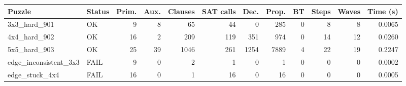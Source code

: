 \begin{tabular}{l l r r r r r r r r r r }
\hline
Puzzle & Status & Prim. & Aux. & Clauses & SAT calls & Dec. & Prop. & BT & Steps & Waves & Time (s) \\
\hline
3x3\_hard\_901 & OK & 9 & 8 & 65 & 44 & 0 & 285 & 0 & 8 & 8 & 0.0065 \\
4x4\_hard\_902 & OK & 16 & 2 & 209 & 119 & 351 & 974 & 0 & 14 & 12 & 0.0260 \\
5x5\_hard\_903 & OK & 25 & 39 & 1046 & 261 & 1254 & 7889 & 4 & 22 & 19 & 0.2247 \\
edge\_inconsistent\_3x3 & FAIL & 9 & 0 & 2 & 1 & 0 & 1 & 0 & 0 & 0 & 0.0002 \\
edge\_stuck\_4x4 & FAIL & 16 & 0 & 1 & 16 & 0 & 16 & 0 & 0 & 0 & 0.0005 \\
\hline
\end{tabular}
